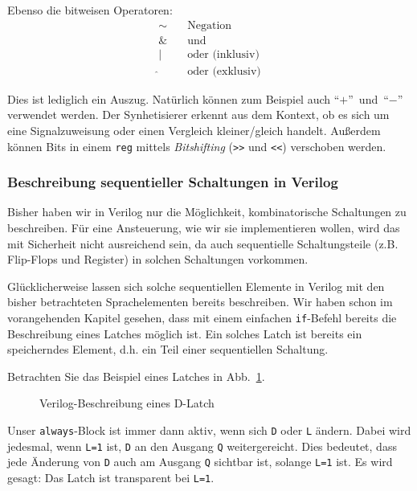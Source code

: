 Ebenso die bitweisen Operatoren:
\begin{align*}
\sim& \quad \text{Negation} \\
\&& \quad \text{und}\\
|& \quad \text{oder (inklusiv)} \\
\hat{}& \quad \text{oder (exklusiv)}
\end{align*}

Dies ist lediglich ein Auszug. Natürlich können zum Beispiel auch "`$+$"'~und~"`$-$"' verwendet werden. Der Synhetisierer erkennt aus dem Kontext, ob es sich um eine
Signalzuweisung oder einen Vergleich kleiner/gleich handelt. Außerdem können Bits in einem \texttt{reg} mittels \textit{Bitshifting} (\texttt{>{}>} und \texttt{<{}<}) verschoben werden.

\subsubsection{Beschreibung sequentieller Schaltungen in Verilog}
Bisher haben wir in Verilog nur die M\"{o}glichkeit, kombinatorische
Schaltungen zu beschreiben. Für eine Ansteuerung, wie wir sie
implementieren wollen, wird das mit Sicherheit nicht ausreichend
sein, da auch sequentielle Schaltungsteile (z.B. Flip-Flops und
Register) in solchen Schaltungen vorkommen.

Gl\"{u}cklicherweise lassen sich solche sequentiellen Elemente in
Verilog mit den bisher betrachteten Sprachelementen bereits
beschreiben. Wir haben schon im vorangehenden Kapitel gesehen, 
dass mit einem einfachen \texttt{if}-Befehl
bereits die Beschreibung eines Latches m\"{o}glich ist. Ein solches
Latch ist bereits ein speicherndes Element, d.h. ein Teil einer
sequentiellen Schaltung.

Betrachten Sie das Beispiel eines Latches in Abb.~\ref{latch}.
\begin{figure}[h]
	\lstset{style=verilog-style}
	
	\caption{Verilog-Beschreibung eines D-Latch}
	\label{latch}
\end{figure}


Unser \texttt{always}-Block ist immer dann aktiv, wenn sich \texttt{D}
oder \texttt{L} \"{a}ndern. Dabei wird jedesmal, wenn \texttt{L=1} ist, \texttt{D} an den
Ausgang \texttt{Q} weitergereicht. Dies bedeutet, dass jede \"{A}nderung von \texttt{D} auch am Ausgang \texttt{Q} sichtbar ist, solange \texttt{L=1} ist. Es wird gesagt:
Das Latch ist transparent bei \texttt{L=1}. 

